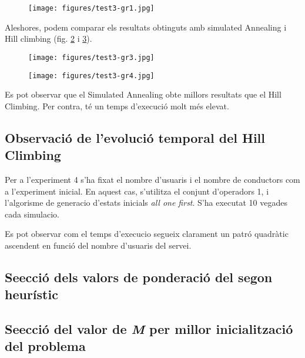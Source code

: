 \begin{figure}[H]
\begin{center}
 \texttt{[image: figures/test3-gr1.jpg]}
 \label{test3-gr2}
\end{center}
\end{figure}


Aleshores, podem comparar els resultats obtinguts amb simulated Annealing i Hill climbing (fig. \ref{test3-gr3} i \ref{test3-gr4}).


\begin{figure}[H]
\begin{center} 
 \texttt{[image: figures/test3-gr3.jpg]}
\label{test3-gr3}
\end{center}
\end{figure}


\begin{figure}[H]
\begin{center}
 \texttt{[image: figures/test3-gr4.jpg]}
 \label{test3-gr4}
\end{center}
\end{figure}

Es pot observar que el Simulated Annealing obte millors resultats que el Hill Climbing. Per contra, té un temps d'execució molt més elevat.


\subsection{Observació de l'evolució temporal del Hill Climbing}
Per a l'experiment 4 s'ha fixat el nombre d'usuaris i el nombre de conductors com a l'experiment inicial.
En aquest cas, s'utilitza el conjunt d'operadors 1, i l'algorisme de generacio d'estats inicials \emph{all one first}.
S'ha executat 10 vegades cada simulacio.

Es pot observar com el temps d'execucio segueix clarament un patró quadràtic ascendent en funció del nombre d'usuaris
del servei.




\subsection{Se\lgem ecció dels valors de ponderació del segon heurístic}

\subsection{Se\lgem ecció del valor de \emph{M} per millor inicialització del problema}